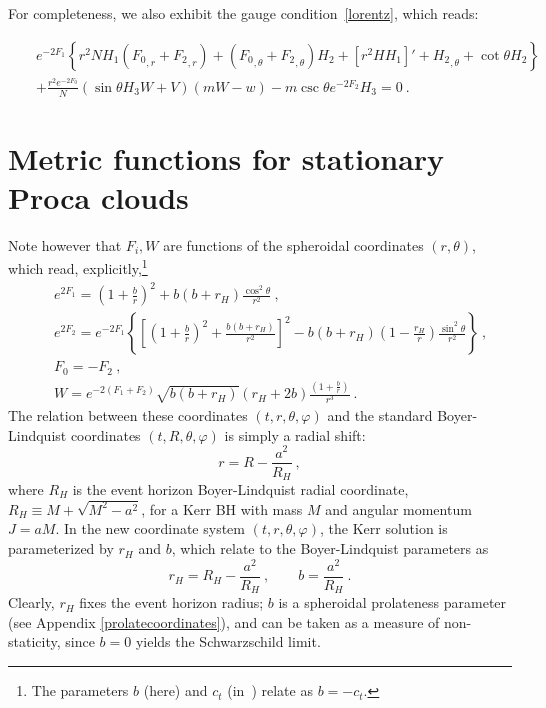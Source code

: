 For completeness, we also exhibit the gauge condition~\eqref{lorentz}, which reads:


\begin{eqnarray}
&&
e^{-2 {F_1}} \left\{r^2 N{H_1}( {F_0}_{,r}+ {F_2}_{,r})
+({F_0}_{,\theta} + {F_2}_{,\theta} ){H_2}
+[r^2 H  {H_1}]'
+ {H_2}_{,\theta}
+\cot \theta {H_2}
\right\}
 \nonumber \\
%
&&
+\frac{r^2e^{-2 {F_0}}}{N}
 (\sin \theta  {H_3} W+  V)(mW-w)
-{m} \csc \theta e^{-2 {F_2}} {H_3}=0 \ .
\end{eqnarray}

\section{Metric functions for stationary Proca clouds}

Note however that $F_i,W$ are functions of the spheroidal coordinates $(r,\theta)$, which read, explicitly,\footnote{The parameters $b$ (here) and $c_t$ (in~\cite{Herdeiro:2015gia}) relate as $b=-c_t$.}
%
\begin{eqnarray}
\nonumber
&&
e^{2F_1}=\left(1+\frac{b}{r}\right)^2+b(b+r_H)\frac{\cos^2\theta}{r^2}\ ,
\\
\nonumber
&&
e^{2F_2}=e^{-2F_1}
\left\{
          \left[
\left(1+\frac{b}{r}\right)^2+\frac{b(b+r_H)}{r^2}
          \right]^2-b(b+r_H)\left(1-\frac{r_H}{r}\right)\frac{\sin^2\theta}{r^2}
\right\}\ ,
\\
\nonumber
&&
F_0=-F_2 \ , \\
&&
\label{functionsKerr}
\displaystyle{W=e^{-2(F_1+F_2)}
\sqrt{b(b+r_H)}(r_H+2b)
\frac{(1+\frac{b}{r})}{r^3}} \ .
\end{eqnarray}
The relation between these coordinates $(t,r,\theta,\varphi)$ and the standard Boyer-Lindquist coordinates $(t,R,\theta,\varphi)$ is simply a radial shift:
\begin{equation}
r=R-\frac{a^2}{R_H} \ , 
\end{equation}
where $R_H$ is the event horizon Boyer-Lindquist radial coordinate,  $R_H\equiv M+\sqrt{M^2-a^2}$, for a Kerr BH with mass $M$ and angular momentum $J=aM$. In the new coordinate system $(t,r,\theta,\varphi)$, the Kerr solution is parameterized by $r_H$ and $b$, which relate to the Boyer-Lindquist parameters as
\begin{equation}
r_H=R_H-\frac{a^2}{R_H} \ , \qquad b=\frac{a^2}{R_H} \ .
\end{equation}
Clearly, $r_H$ fixes the event horizon radius; $b$ is a spheroidal prolateness parameter (see Appendix \ref{prolatecoordinates}), and can be taken as a measure of non-staticity, since $b=0$ yields the Schwarzschild limit.


